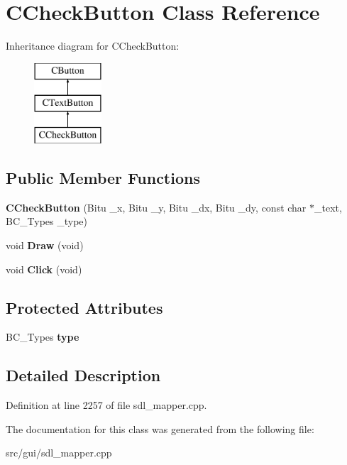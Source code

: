 \hypertarget{classCCheckButton}{\section{C\-Check\-Button Class Reference}
\label{classCCheckButton}
}
Inheritance diagram for C\-Check\-Button\-:\begin{figure}[H]
\begin{center}
\leavevmode
\includegraphics[height=3.000000cm]{classCCheckButton}
\end{center}
\end{figure}
\subsection*{Public Member Functions}
\begin{DoxyCompactItemize}
\item 
\hypertarget{classCCheckButton_a54c679603fea5cb3e04277f6099d2067}{{\bfseries C\-Check\-Button} (Bitu \-\_\-x, Bitu \-\_\-y, Bitu \-\_\-dx, Bitu \-\_\-dy, const char $\ast$\-\_\-text, B\-C\-\_\-\-Types \-\_\-type)}\label{classCCheckButton_a54c679603fea5cb3e04277f6099d2067}

\item 
\hypertarget{classCCheckButton_a1893209408d4822886cd6e39aab69db4}{void {\bfseries Draw} (void)}\label{classCCheckButton_a1893209408d4822886cd6e39aab69db4}

\item 
\hypertarget{classCCheckButton_a5d3d194c8eedc74fbb7862165737833e}{void {\bfseries Click} (void)}\label{classCCheckButton_a5d3d194c8eedc74fbb7862165737833e}

\end{DoxyCompactItemize}
\subsection*{Protected Attributes}
\begin{DoxyCompactItemize}
\item 
\hypertarget{classCCheckButton_a5351f20571c7ed787def47ae73a1820f}{B\-C\-\_\-\-Types {\bfseries type}}\label{classCCheckButton_a5351f20571c7ed787def47ae73a1820f}

\end{DoxyCompactItemize}


\subsection{Detailed Description}


Definition at line 2257 of file sdl\-\_\-mapper.\-cpp.



The documentation for this class was generated from the following file\-:\begin{DoxyCompactItemize}
\item 
src/gui/sdl\-\_\-mapper.\-cpp\end{DoxyCompactItemize}
